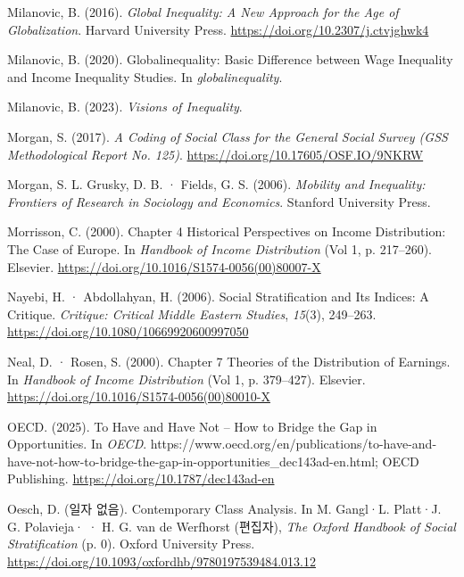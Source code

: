 \documentclass[
  letterpaper,
  DIV=11,
  numbers=noendperiod]{scrartcl}
\newlength{\cslhangindent}
\newenvironment{CSLReferences}[2] %
 {\begin{list}{}{%
  \setlength{\itemindent}{0pt}
  \setlength{\leftmargin}{0pt}
  \setlength{\parsep}{0pt}
  \ifodd #1
   \setlength{\leftmargin}{\cslhangindent}
   \setlength{\itemindent}{-1\cslhangindent}
  \fi
  \setlength{\itemsep}{#2\baselineskip}}}
 {\end{list}}
\begin{document}
\begin{CSLReferences}{1}{0}
Milanovic, B. (2016). \emph{Global {Inequality}: {A New Approach} for
the {Age} of {Globalization}}. Harvard University Press.
\url{https://doi.org/10.2307/j.ctvjghwk4}

Milanovic, B. (2020). Globalinequality: {Basic} Difference between Wage
Inequality and Income Inequality Studies. In \emph{globalinequality}.

Milanovic, B. (2023). \emph{Visions of {Inequality}}.

Morgan, S. (2017). \emph{A {Coding} of {Social Class} for the {General
Social Survey} ({GSS Methodological Report No}. 125)}.
\url{https://doi.org/10.17605/OSF.IO/9NKRW}

Morgan, S. L. Grusky, D. B. · Fields, G. S. (2006). \emph{Mobility and
{Inequality}: {Frontiers} of {Research} in {Sociology} and {Economics}}.
Stanford University Press.

Morrisson, C. (2000). Chapter 4 {Historical} Perspectives on Income
Distribution: {The} Case of {Europe}. In \emph{Handbook of {Income
Distribution}} (Vol 1, p. 217--260). Elsevier.
\url{https://doi.org/10.1016/S1574-0056(00)80007-X}

Nayebi, H. · Abdollahyan, H. (2006). Social {Stratification} and Its
{Indices}: {A Critique}. \emph{Critique: Critical Middle Eastern
Studies}, \emph{15}(3), 249--263.
\url{https://doi.org/10.1080/10669920600997050}

Neal, D. · Rosen, S. (2000). Chapter 7 {Theories} of the Distribution of
Earnings. In \emph{Handbook of {Income Distribution}} (Vol 1, p.
379--427). Elsevier. \url{https://doi.org/10.1016/S1574-0056(00)80010-X}

OECD. (2025). To {Have} and {Have Not} -- {How} to {Bridge} the {Gap} in
{Opportunities}. In \emph{OECD}.
https://www.oecd.org/en/publications/to-have-and-have-not-how-to-bridge-the-gap-in-opportunities\_dec143ad-en.html;
OECD Publishing. \url{https://doi.org/10.1787/dec143ad-en}

Oesch, D. (일자 없음). Contemporary {Class Analysis}. In M. Gangl·L.
Platt·J. G. Polavieja· · H. G. van de Werfhorst (편집자), \emph{The
{Oxford Handbook} of {Social Stratification}} (p. 0). Oxford University
Press. \url{https://doi.org/10.1093/oxfordhb/9780197539484.013.12}


\end{CSLReferences}
\end{document}
